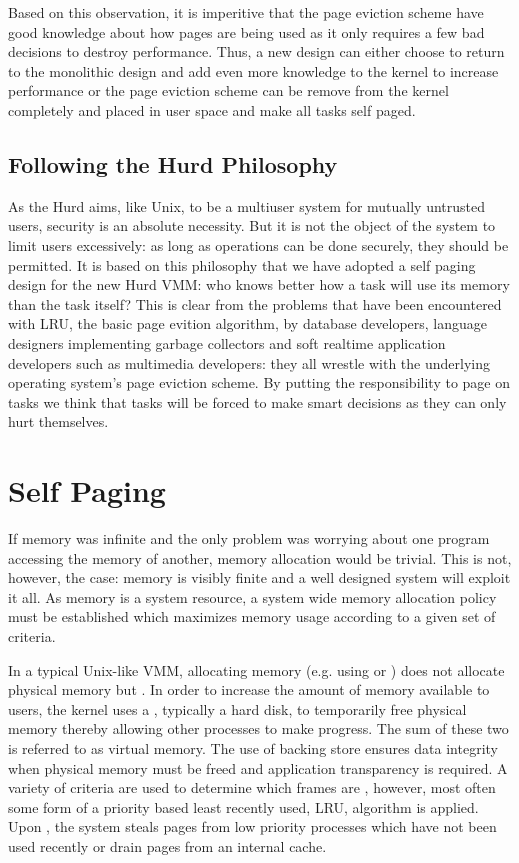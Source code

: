 Based on this observation, it is imperitive that the page eviction
scheme have good knowledge about how pages are being used as it only
requires a few bad decisions to destroy performance.  Thus, a new
design can either choose to return to the monolithic design and add
even more knowledge to the kernel to increase performance or the page
eviction scheme can be remove from the kernel completely and placed in
user space and make all tasks self paged.

\subsection{Following the Hurd Philosophy}

As the Hurd aims, like Unix, to be a multiuser system for mutually
untrusted users, security is an absolute necessity.  But it is not the
object of the system to limit users excessively: as long as operations
can be done securely, they should be permitted.  It is based on this
philosophy that we have adopted a self paging design for the new Hurd
VMM: who knows better how a task will use its memory than the task
itself?  This is clear from the problems that have been encountered
with LRU, the basic page evition algorithm, by database developers,
language designers implementing garbage collectors and soft realtime
application developers such as multimedia developers: they all wrestle
with the underlying operating system's page eviction scheme.  By
putting the responsibility to page on tasks we think that tasks will
be forced to make smart decisions as they can only hurt themselves.

\section{Self Paging}

If memory was infinite and the only problem was worrying about one
program accessing the memory of another, memory allocation would be
trivial.  This is not, however, the case: memory is visibly finite and
a well designed system will exploit it all.  As memory is a system
resource, a system wide memory allocation policy must be established
which maximizes memory usage according to a given set of criteria.

In a typical Unix-like VMM, allocating memory (e.g. using
 or ) does not allocate physical memory
but .  In order to increase the amount of
memory available to users, the kernel uses a ,
typically a hard disk, to temporarily free physical memory thereby
allowing other processes to make progress.  The sum of these two is
referred to as virtual memory.  The use of backing store ensures data
integrity when physical memory must be freed and application
transparency is required.  A variety of criteria are used to determine
which frames are , however, most often some form of
a priority based least recently used, LRU, algorithm is applied.  Upon
, the system steals pages from low priority
processes which have not been used recently or drain pages from an
internal cache.

